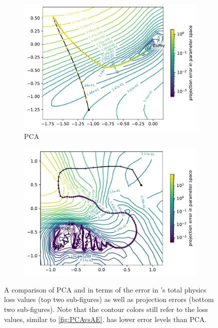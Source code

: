 \documentclass[letterpaper]{article} %
\begin{document}
\begin{figure}[htbp]
\begin{subfigure}[b]{0.3\textwidth}
              \end{subfigure}
              \begin{subfigure}[b]{0.3\textwidth}
                \includegraphics[width=\textwidth]{figures/round3/Cophy_PCA/directions.h5_proj_cos_phy_total.h5_total_phy_dists_param_space_2dcontour_proj.pdf}
                \caption{PCA}
                \label{fig:PCAvsAE2_PCAdistances}
              \end{subfigure}
              \begin{subfigure}[b]{0.3\textwidth}
                \includegraphics[width=\textwidth]{figures/round3/Cophy_NV/map_phy_total_dists_param_space.pdf}
                \caption{\proposedautencoder{}}
                \label{fig:PCAvsAE2_distances}
              \end{subfigure}

              \caption{A comparison of PCA and \proposedautencoder{} in terms of the error in \cophy{}'s total physics loss values (top two sub-figures) as well as projection errors (bottom two sub-figures). Note that the contour colors still refer to the loss values, similar to \cref{fig:PCAvsAE}. \proposedautencoder{} has lower error levels than PCA.}
              \label{fig:PCAvsAE2}
            \end{figure}
\end{document}
